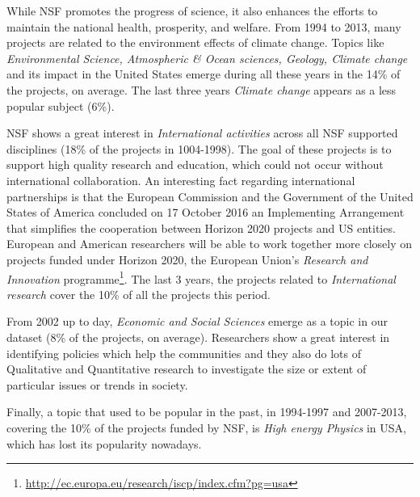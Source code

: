 \documentclass[12pt]{report}
\begin{document}
While NSF promotes the progress of science, it also enhances the efforts to
maintain the national health, prosperity, and welfare. From 1994 to 2013,
many projects are related to the environment effects of climate change. Topics
like \emph{Environmental Science, Atmospheric \& Ocean sciences, Geology, Climate
change} and its impact in the United States emerge during all these years in the 14\% 
of the projects, on average. The last three years \emph{Climate change} 
appears as a less popular subject (6\%).

NSF shows a great interest in \emph{International activities} across all NSF
supported disciplines (18\% of the projects in 1004-1998). The goal of these projects is 
to support high quality research and education, which could not occur without
international collaboration.
An interesting fact regarding international partnerships is that the
European Commission and the Government of the United States of America
concluded on 17 October 2016 an Implementing Arrangement that
simplifies the cooperation between Horizon 2020 projects and US
entities. European and American researchers will be able to work
together more closely on projects funded under Horizon 2020, the
European Union's \emph{Research and Innovation}
programme\footnote{\url{http://ec.europa.eu/research/iscp/index.cfm?pg=usa}}. The last
3 years, the projects related to \emph{International research} cover the 10\% of all the 
projects this period.

From 2002 up to day, \emph{Economic and Social Sciences} emerge as a topic in our
dataset (8\% of the projects, on average). Researchers show a great interest in identifying 
policies which help the communities and they also do lots of Qualitative and Quantitative 
research to investigate the size or extent of particular issues or trends in society.

Finally, a topic that used to be popular in the past, in 1994-1997 and
2007-2013, covering the 10\% of the projects funded by NSF, is \emph{High energy Physics} 
in USA, which has lost its popularity nowadays.
\end{document}
